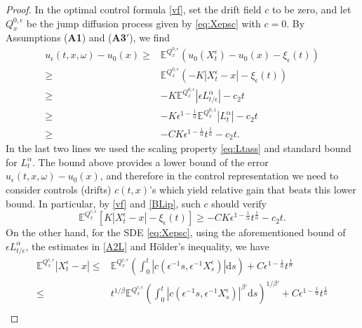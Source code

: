 \documentclass[11pt,reqno]{amsart}
\theoremstyle{definition}
\theoremstyle{remark}
\numberwithin{equation}{section}
\newcommand{\eps}{\epsilon}
\begin{document}
\begin{proof}
In the optimal control formula \eqref{vf}, set the drift field $c$ to be zero, and let $Q^{0,\eps}_x$ be the jump diffusion process given by \eqref{eq:Xepsc} with $c=0$. By Assumptions {\upshape ({\bf A1})} and {\upshape ({\bf A3$'$})}, we find 
\begin{equation}
\label{eq:lowercontrol}
\begin{aligned}
    u_{\epsilon}(t,x,\omega) - u_{0}(x) \geq &  \mathbb{E}^{Q^{0,\epsilon}_{x}} \left( u_{0}(X^{\epsilon}_{t}) - u_{0}(x) - \xi_{\epsilon}(t) \right) \nonumber \\
    \geq &  \mathbb{E}^{Q^{0,\epsilon}_{x}}\left(-K|X^{\epsilon}_{t} - x| - \xi_{\epsilon}(t) \right) \nonumber \\
    \geq & - K\mathbb{E}^{Q^{0,\epsilon}_{x}} | \epsilon L^{\alpha}_{t/\epsilon}| - c_2 t \nonumber \\
    \geq & - K\epsilon^{1-\frac{1}{\alpha}} \mathbb{E}^{Q^{0,1}_{x}} |L^{\alpha}_{t}| - c_2 t\nonumber \\
    \geq & - CK \epsilon^{1-\frac{1}{\alpha}} t^{\frac{1}{\alpha}} - c_2 t.
\end{aligned}
\end{equation}
In the last two lines we used the scaling property \eqref{eq:Ltass} and standard bound for $L^\alpha_t$. The bound above provides a lower bound of the error $u_\eps(t,x,\omega) -u_0(x)$, and therefore in the control representation we need to consider controls (drifts) $c(t,x)$'s which yield relative gain that beats this lower bound. In particular, by \eqref{vf} and \eqref{BLip}, such $c$ should verify
\begin{equation}\label{LBE1}
    \mathbb{E}^{Q^{c,\epsilon}_{x}} [K|X^{\epsilon}_{t} - x| - \xi_{\epsilon}(t)] \geq  - CK\epsilon^{1-\frac{1}{\alpha}} t^{\frac{1}{\alpha}} - c_2 t.   
\end{equation}
On the other hand, for the SDE \eqref{eq:Xepsc}, using the aforementioned bound of $\eps L^\alpha_{t/\eps}$, the estimates in \eqref{A2L} and H\"{o}lder's inequality, we have
\begin{align}\label{LBE2}
    \mathbb{E}^{Q^{c,\epsilon}_{x}} |X^{\epsilon}_{t} - x| \leq & \mathbb{E}^{Q^{c,\epsilon}_{x}}\left( \int^{t}_{0} |c(\epsilon^{-1}s, \epsilon^{-1}X^{\epsilon}_{s})| \mathrm{d}s \right) + C\epsilon^{1-\frac{1}{\alpha}} t^{\frac{1}{\alpha}} \nonumber \\
    \leq & t^{1/\beta} \mathbb{E}^{Q^{c,\epsilon}_{x}}\left( \int^{t}_{0} |c(\epsilon^{-1}s, \epsilon^{-1}X^{\epsilon}_{s})|^{\beta'} \mathrm{d}s \right)^{1/\beta'}  + C\epsilon^{1-\frac{1}{\alpha}} t^{\frac{1}{\alpha}} \nonumber \\

\end{align}
\end{proof}
\end{document}
